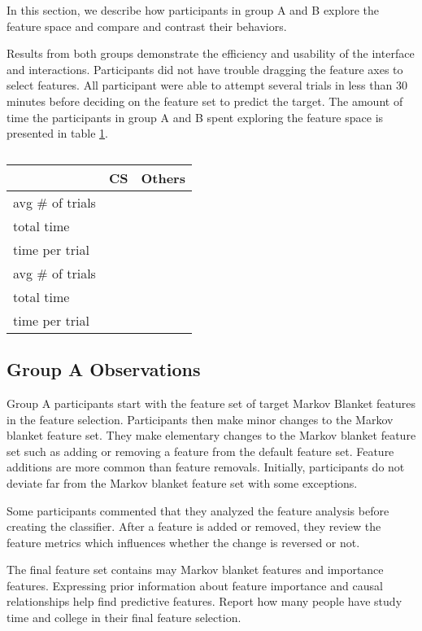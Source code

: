 In this section, we describe how participants in group A and B explore the feature space and compare and contrast their behaviors.

Results from both groups demonstrate the efficiency and usability of the interface and interactions. Participants did not have trouble dragging the feature axes to select features. All participant were able to attempt several trials in less than 30 minutes before deciding on the feature set to predict the target. The amount of time the participants in group A and B spent exploring the feature space is presented in table \ref{versionAvsversionB}.

\begin{table}[]
\centering
\begin{tabular}{lcc}
\hline
                 & CS & Others \\ \hline
avg \# of trials &    &        \\
total time       &    &        \\
time per trial   &    &        \\ \hline
avg \# of trials &    &        \\
total time       &    &        \\
time per trial   &    &        \\ \hline
\end{tabular}
\caption{}
\label{versionAvsversionB}
\end{table}

\subsection { Group A Observations}
Group A participants start with the feature set of target Markov Blanket features in the feature selection. Participants then make minor changes to the Markov blanket feature set. They make elementary changes to the Markov blanket feature set such as adding or removing a feature from the default feature set. Feature additions are more common than feature removals. Initially, participants do not deviate far from the Markov blanket feature set with some exceptions.

Some participants commented that they analyzed the feature analysis before creating the classifier. After a feature is added or removed, they review the feature metrics which influences whether the change is reversed or not.

The final feature set contains may Markov blanket features and importance features. Expressing prior information about feature importance and causal relationships help find predictive features. Report how many people have study time and college in their final feature selection.

